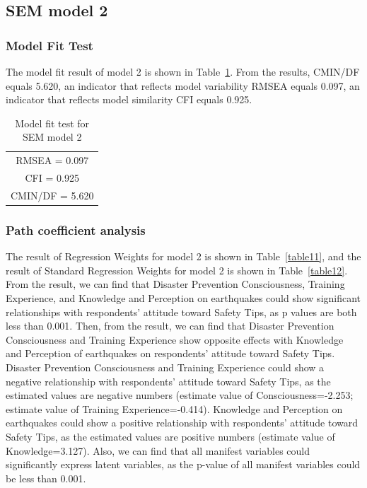 \subsection{SEM model 2}


\subsubsection{Model Fit Test}
The model fit result of model 2 is shown in Table~\ref{table16}. From the results, CMIN/DF equals 5.620, an indicator that reflects model variability RMSEA equals 0.097, an indicator that reflects model similarity CFI equals 0.925.

\begin{table}[h]
  \caption{Model fit test for SEM model 2}
  \label{table16}
  \centering 
  \begin{tabular}{|c|}
  \hline
  RMSEA = 0.097 \\
  CFI = 0.925 \\
  CMIN/DF = 5.620 \\
  \hline
  \end{tabular}
\end{table}

\subsubsection{Path coefficient analysis}
The result of Regression Weights for model 2 is shown in Table~\ref{table11}, and the result of Standard Regression Weights for model 2 is shown in Table~\ref{table12}. From the result, we can find that Disaster Prevention Consciousness, Training Experience, and Knowledge and Perception on earthquakes could show significant relationships with respondents' attitude toward Safety Tips, as p values are both less than 0.001. Then, from the result, we can find that Disaster Prevention Consciousness and Training Experience show opposite effects with Knowledge and Perception of earthquakes on respondents' attitude toward Safety Tips.  Disaster Prevention Consciousness and Training Experience could show a negative relationship with respondents' attitude toward Safety Tips, as the estimated values are negative numbers (estimate value of Consciousness=-2.253; estimate value of Training Experience=-0.414). Knowledge and Perception on earthquakes could show a positive relationship with respondents' attitude toward Safety Tips, as the estimated values are positive numbers (estimate value of Knowledge=3.127). Also, we can find that all manifest variables could significantly express latent variables, as the p-value of all manifest variables could be less than 0.001. 

